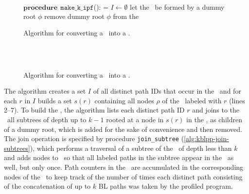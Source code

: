 \ifdefined\noauthorea
\begin{figure}[hb!]
\IncMargin{2em}
\begin{algorithm}[H]
\DontPrintSemicolon
\LinesNumbered
\SetAlgoNoLine
\SetNlSkip{1em} 
\Indm\Indmm
\hrulefill\\
$\mathbf{procedure} \> \> \texttt{make\_k\_ipf}$():\;
\vspace{1mm}
\everypar={\nl}
\Indp\Indpp
$I\gets\emptyset$\;
let the \kipf\ be formed by a dummy root $\phi$\;
remove dummy root $\phi$ from the \kipf\;
\vspace{-2mm}
\Indm\Indmm
\nonl\hrulefill\vspace{1mm}\\
\DecMargin{3.5em}
\caption{\label{alg:kblpp-ksf-to-kipf} Algorithm for converting a \ksf\ into a \kipf.}
\IncMargin{1.5em}
\end{algorithm}
\end{figure}

\else
\begin{figure}[ht]
\caption{\label{alg:kblpp-ksf-to-kipf} Algorithm for converting a \ksf\ into a \kipf.}
\begin{small}
\begin{minipage}{0.9\textwidth}
\hrulefill\\
\algmissing\

\vspace{-1mm}
\hrulefill
\vspace{-2mm}
\end{minipage}
\end{small}
\end{figure}
\fi

\noindent The algorithm creates a set $I$ of all distinct path IDs that occur in the \ksf\ and for each $r$ in $I$ builds a set $s(r)$ containing all nodes $\rho$ of the \ksf\ labeled with $r$ (lines 2--7). To build the \kipf, the algorithm lists each distinct path ID $r$ and joins to the \kipf\ all subtrees of depth up to $k-1$ rooted at a node in $s(r)$ in the \ksf, as children of a dummy root, which is added for the sake of convenience and then removed. The join operation is specified by procedure {\tt join\_subtree} (\myalgorithm\ref{alg:kblpp-join-subtrees}), which performs a traversal of a subtree of the \ksf\ of depth less than $k$ and adds nodes to \kipf\ so that all labeled paths in the subtree appear in the \kipf\ as well, but only once. Path counters in the \ksf\ are accumulated in the corresponding nodes of the \kipf\ to keep track of the number of times each distinct path consisting of the concatenation of up to $k$ BL paths was taken by the profiled program.

